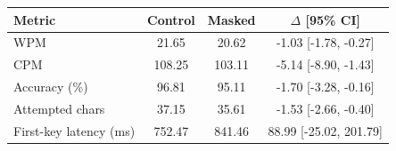 \begin{tabular}{lccc}
\toprule
Metric & Control & Masked & $\Delta$ [95\% CI] \\
\midrule
WPM & 21.65 & 20.62 & -1.03 [-1.78, -0.27] \\
CPM & 108.25 & 103.11 & -5.14 [-8.90, -1.43] \\
Accuracy (\%) & 96.81 & 95.11 & -1.70 [-3.28, -0.16] \\
Attempted chars & 37.15 & 35.61 & -1.53 [-2.66, -0.40] \\
First-key latency (ms) & 752.47 & 841.46 & 88.99 [-25.02, 201.79] \\
\bottomrule
\end{tabular}
